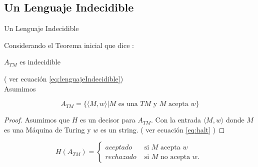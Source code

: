 \documentclass[11pt]{beamer}
\begin{document}
	\subsection{Un Lenguaje Indecidible}
	    \begin{frame}{Un Lenguaje Indecidible}
			\justifying
			
			Considerando el Teorema inicial \cite{Sipser2013} que dice :\\
			
			\begin{theorem}
                $A_{TM}$ es indecidible
            \end{theorem}
			 ( ver ecuación \ref{eq:lenguajeIndecidible}) \\
			
			Asumimos
			
			\begin{equation} \label{eq:lenguajeIndecidible}
			    A_{TM} = \{ \langle M,w \rangle | M \text{ es una } TM \text{ y } M \text{ acepta } w \}
			\end{equation}
			
			
			\begin{proof}
                Asumimos que $H$ es un decisor para $A_{TM}$. Con la entrada $\langle M,w \rangle$ donde $M$ es una Máquina de Turing y $w$ es un string. ( ver ecuación \ref{eq:halt} )
            \end{proof}
			
			\begin{equation} \label{eq:halt}
			    H(A_{TM}) = \begin{cases}
                            aceptado & \text{ si $M$ acepta $w$ } \\
                            rechazado & \text{ si $M$ no acepta $w$. }
                        \end{cases}
			\end{equation}
			
		\end{frame}
		
\end{document}
